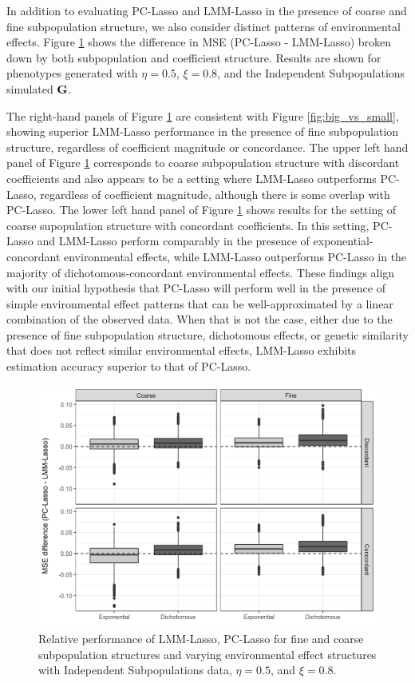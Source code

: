 In addition to evaluating PC-Lasso and LMM-Lasso in the presence of coarse and fine subpopulation structure, we also consider distinct patterns of environmental effects. Figure \ref{fig:big_small_gamma} shows the difference in MSE (PC-Lasso - LMM-Lasso) broken down by both subpopulation and coefficient structure. Results are shown for phenotypes generated with $\eta = 0.5$, $\xi = 0.8$, and the Independent Subpopulations simulated $\textbf{G}$. 

The right-hand panels of Figure \ref{fig:big_small_gamma} are consistent with Figure \ref{fig:big_vs_small}, showing superior LMM-Lasso performance in the presence of fine subpopulation structure, regardless of coefficient magnitude or concordance. The upper left hand panel of Figure \ref{fig:big_small_gamma} corresponds to coarse subpopulation structure with discordant coefficients and also appears to be a setting where LMM-Lasso outperforms PC-Lasso, regardless of coefficient magnitude, although there is some overlap with PC-Lasso. The lower left hand panel of Figure \ref{fig:big_small_gamma} shows results for the setting of coarse supopulation structure with concordant coefficients. In this setting, PC-Lasso and LMM-Lasso perform comparably in the presence of exponential-concordant environmental effects, while LMM-Lasso outperforms PC-Lasso in the majority of dichotomous-concordant environmental effects. These findings align with our initial hypothesis that PC-Lasso will perform well in the presence of simple environmental effect patterns that can be well-approximated by a linear combination of the observed data. When that is not the case, either due to the presence of fine subpopulation structure, dichotomous effects, or genetic similarity that does not reflect similar environmental effects, LMM-Lasso exhibits estimation accuracy superior to that of PC-Lasso.

\begin{figure}[H]
    \centering
    \includegraphics[scale = 0.9]{figures/mse_diff_hetero.png}
    \caption{Relative performance of LMM-Lasso, PC-Lasso for fine and coarse subpopulation structures and varying environmental effect structures with Independent Subpopulations data, $\eta = 0.5$, and $\xi = 0.8$.}
    \label{fig:big_small_gamma}
\end{figure}

